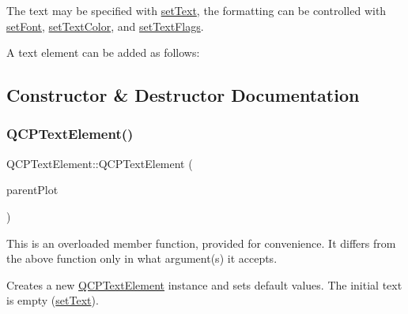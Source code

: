 The text may be specified with \hyperlink{classQCPTextElement_ac44b81e69e719b879eb2feecb33557e2}{set\+Text}, the formatting can be controlled with \hyperlink{classQCPTextElement_a09b3241769528fa87cb4bf35c97defad}{set\+Font}, \hyperlink{classQCPTextElement_a4f3b8361c3ffb3f84346954929ce93ba}{set\+Text\+Color}, and \hyperlink{classQCPTextElement_ab908f437f552020888a3ad8cf8242605}{set\+Text\+Flags}.

A text element can be added as follows\+: 
\begin{DoxyCodeInclude}
\end{DoxyCodeInclude}


\subsection{Constructor \& Destructor Documentation}
\mbox{\label{classQCPTextElement_ae1de18bdb1e7ba959f132018dd9a0258}} 
\subsubsection{\texorpdfstring{Q\+C\+P\+Text\+Element()}{QCPTextElement()}\hspace{0.1cm}{\footnotesize\ttfamily [1/5]}}
{\footnotesize\ttfamily Q\+C\+P\+Text\+Element\+::\+Q\+C\+P\+Text\+Element (\begin{DoxyParamCaption}\item[{\hyperlink{classQCustomPlot}{Q\+Custom\+Plot} $\ast$}]{parent\+Plot }\end{DoxyParamCaption})\hspace{0.3cm}{\ttfamily [explicit]}}

This is an overloaded member function, provided for convenience. It differs from the above function only in what argument(s) it accepts.

Creates a new \hyperlink{classQCPTextElement}{Q\+C\+P\+Text\+Element} instance and sets default values. The initial text is empty (\hyperlink{classQCPTextElement_ac44b81e69e719b879eb2feecb33557e2}{set\+Text}). \mbox{\label{classQCPTextElement_a00f08a8a3363ad8d7d12ca0db4922b6b}} 
